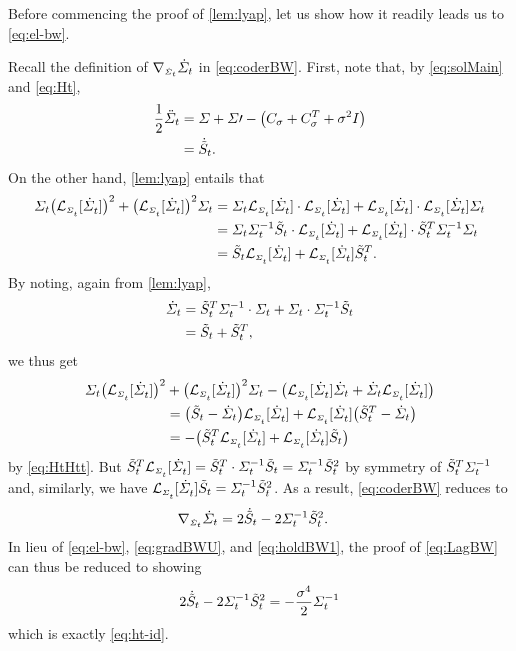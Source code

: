 Before commencing the proof of \cref{lem:lyap}, let us show how it readily leads us to \eqref{eq:el-bw}.

Recall the definition of $\nabla_{\scriptscriptstyle\dot{\Sigma}_{t}}\dot{\Sigma}_{t}$ in \eqref{eq:coderBW}. First, note that, by \eqref{eq:solMain} and \eqref{eq:Ht},
\begin{align}
\label{eq:ddot}
\frac{1}{2}\ddSigcurve &=   \Sigma+\Sigma\prime -  \parens*{  \C + \C^T + \sdev^2\eye }   \\
&=  \dHt.
\end{align}
On the other hand, \cref{lem:lyap} entails that
\begin{align}
\nn
\Sigcurve \parens*{\lyap}^2 + \parens*{\lyap}^2 \Sigcurve &= \Sigcurve \lyap \cdot \lyap + \lyap \cdot \lyap\Sigcurve \\
\nn
 &= \Sigcurve \Sigcurveinv \Ht \cdot \lyap + \lyap \cdot \Ht^T  \Sigcurveinv \Sigcurve \\
 \label{eq:holdBW}
 &= \Ht \lyap + \lyap \Ht^T .
\end{align}
By noting, again from \cref{lem:lyap},
\begin{align}
\nn
\dSigcurve &= \Ht^T  \Sigcurveinv \cdot \Sigcurve + \Sigcurve \cdot \Sigcurveinv\Ht \\
\label{eq:HtHtt}
&= \Ht + \Ht^T ,
\end{align}
we thus get
\begin{align}\nn
 \Sigcurve \parens*{\lyap}^2 &+ \parens*{\lyap}^2 \Sigcurve- \parens*{  \lyap \dSigcurve + \dSigcurve\lyap } \\
 &= \parens*{\Ht - \dSigcurve} \lyap + \lyap \parens*{\Ht^T  - \dSigcurve} \\
 \nn
 &= - \parens*{ \Ht^T \lyap + \lyap \Ht  }
\end{align}by \eqref{eq:HtHtt}. But $\Ht^T \lyap  = \Ht^T  \cdot \Sigcurveinv \Ht =\Sigcurveinv \Ht^2$ by symmetry of $\tilde{S}_{t}^T  \Sigma^{-1}_{t}$ and, similarly, we have $\lyap\Ht =  \Sigcurveinv \Ht^2$. As a result, \eqref{eq:coderBW} reduces to
\begin{align}
\label{eq:holdBW1}
\coder &= 2\dHt - 2 \Sigcurveinv\Ht^2.
\end{align}In lieu of \eqref{eq:el-bw}, \eqref{eq:gradBWU}, and \eqref{eq:holdBW1}, the proof of \eqref{eq:LagBW} can thus be reduced to showing
\begin{align}
2\dot{\tilde{S}}_{t} -  2\Sigma^{-1}_{t}\tilde{S}_{t}^2 = -\frac{\sigma^4}{2} \Sigma^{-1}_{t}
\end{align}which is exactly \eqref{eq:ht-id}.



